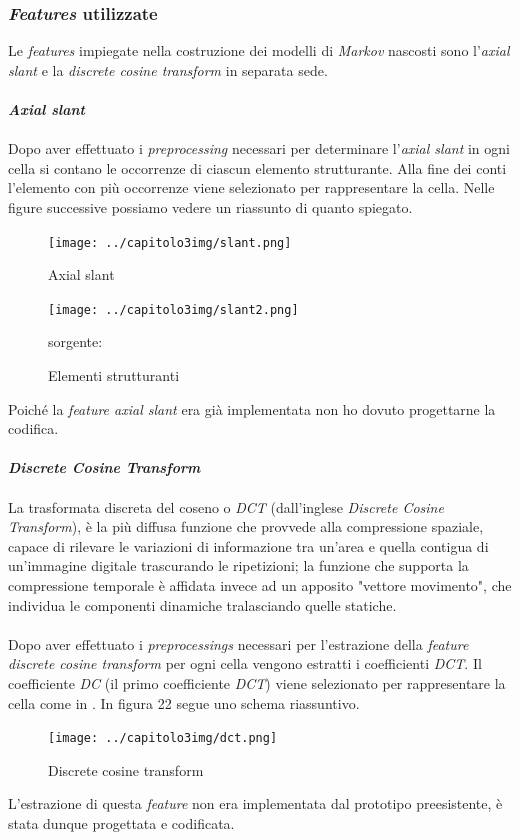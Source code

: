 \subsubsection*{\emph{Features} utilizzate}
\label{3.3.3.7}
Le \emph{features} impiegate nella costruzione dei modelli di \emph{Markov} nascosti sono l'\emph{axial slant} e la \emph{discrete cosine transform} in separata sede.\\\\
\textbf{\emph{Axial slant}}\\\\
Dopo aver effettuato i \emph{preprocessing} necessari per determinare l'\emph{axial slant} in ogni cella si contano le occorrenze di ciascun elemento strutturante. Alla fine dei conti l'elemento con più occorrenze viene selezionato per rappresentare la cella.
Nelle figure successive possiamo vedere un riassunto di quanto spiegato.
\begin{figure}[H]
\centering
\texttt{[image: ../capitolo3img/slant.png]}
\caption{Axial slant}
\end{figure}
\begin{figure}[H]
\centering
\texttt{[image: ../capitolo3img/slant2.png]}
\caption{Elementi strutturanti}sorgente:\cite{3}
\end{figure}
Poiché la \emph{feature axial slant} era già implementata non ho dovuto progettarne la codifica.\\\\
\textbf{\emph{Discrete Cosine Transform}}\\\\
La trasformata discreta del coseno o \emph{DCT} (dall'inglese \emph{Discrete Cosine Transform}), è la più diffusa funzione che provvede alla compressione spaziale, capace di rilevare le variazioni di informazione tra un'area e quella contigua di un'immagine digitale trascurando le ripetizioni; la funzione che supporta la compressione temporale è affidata invece ad un apposito "vettore movimento", che individua le componenti dinamiche tralasciando quelle statiche\cite{10}.\\\\
Dopo aver effettuato i \emph{preprocessings} necessari per l'estrazione della \emph{feature discrete cosine transform} per ogni cella vengono estratti i coefficienti \emph{DCT}. Il coefficiente \emph{DC} (il primo coefficiente \emph{DCT}) viene selezionato per rappresentare la cella come in \cite{5}.
In figura 22 segue uno schema riassuntivo.
\begin{figure}[H]
\centering
\texttt{[image: ../capitolo3img/dct.png]}
\caption{Discrete cosine transform}
\end{figure}
L'estrazione di questa \emph{feature} non era implementata dal prototipo preesistente, è stata dunque progettata e codificata.
